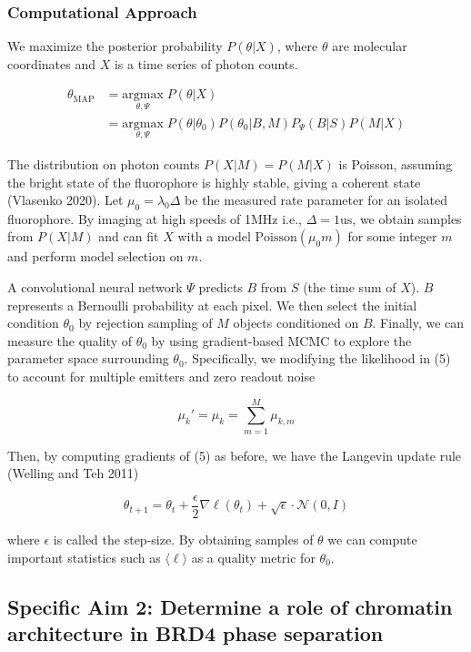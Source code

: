 \documentclass{ucetd}
\begin{document}
\subsubsection{Computational Approach}

We maximize the posterior probability $P(\theta|X)$, where $\theta$ are molecular coordinates and $X$ is a time series of photon counts.

\begin{align*}
\theta_{\text{MAP}} &= \underset{\theta,\Psi}{\mathrm{argmax}}\; P(\theta|X)\\
&= \underset{\theta,\Psi}{\mathrm{argmax}}\; P(\theta|\theta_{0})P(\theta_{0}|B,M)P_{\Psi}(B|S)P(M|X)
\end{align*}

The distribution on photon counts $P(X|M)=P(M|X)$ is Poisson, assuming the bright state of the fluorophore is highly stable, giving a coherent state (Vlasenko 2020). Let $\mu_{0}=\lambda_{0}\Delta$ be the measured rate parameter for an isolated fluorophore. By imaging at high speeds of 1MHz i.e., $\Delta = 1\mathrm{us}$, we obtain samples from $P(X|M)$ and can fit $X$ with a model $\mathrm{Poisson}(\mu_{0}m)$ for some integer $m$ and perform model selection on $m$.

A convolutional neural network $\Psi$ predicts $B$ from $S$ (the time sum of $X$). $B$ represents a Bernoulli probability at each pixel. We then select the initial condition $\theta_{0}$ by rejection sampling of $M$ objects conditioned on $B$. Finally, we can measure the quality of $\theta_{0}$ by using gradient-based MCMC to explore the parameter space surrounding $\theta_{0}$. Specifically, we modifying the likelihood in (5) to account for multiple emitters and zero readout noise

\begin{equation*}
\mu_{k}' = \mu_{k} = \sum_{m=1}^{M} \mu_{k,m}
\end{equation*}

Then, by computing gradients of (5) as before, we have the Langevin update rule (Welling and Teh 2011)

\[ \theta_{t+1} = \theta_t + \frac{\epsilon}{2} \nabla \ell(\theta_t) + \sqrt{\epsilon} \cdot \mathcal{N}(0, I) \]

where $\epsilon$ is called the step-size. By obtaining samples of $\theta$ we can compute important statistics such as $\langle \ell \rangle$ as a quality metric for $\theta_{0}$.

\subsection{Specific Aim 2: Determine a role of chromatin architecture in BRD4 phase separation}
\end{document}
